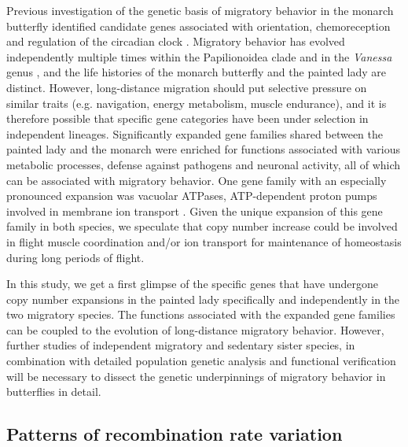\documentclass[twocolumn]{bmcart}%
\begin{document}
Previous investigation of the genetic basis of migratory behavior in the monarch butterfly identified candidate genes associated with orientation, chemoreception and regulation of the circadian clock \citep{zhanGeneticsMonarchButterfly2014, zhuDefiningBehavioralMolecular2009}. Migratory behavior has evolved independently multiple times within the Papilionoidea clade \citep{chowdhuryMigrationButterfliesGlobal2021} and in the \textit{Vanessa} genus \citep{wahlbergVagilityVanessaLepidoptera2011}, and the life histories of the monarch butterfly and the painted lady are distinct. However, long-distance migration should put selective pressure on similar traits (e.g. navigation, energy metabolism, muscle endurance), and it is therefore possible that specific gene categories have been under selection in independent lineages. Significantly expanded gene families shared between the painted lady and the monarch were enriched for functions associated with various metabolic processes, defense against pathogens and neuronal activity, all of which can be associated with migratory behavior. One gene family with an especially pronounced expansion was vacuolar ATPases, ATP-dependent proton pumps involved in membrane ion transport \citep{wieczorekVacuolartypeProtonPumps2009}. Given the unique expansion of this gene family in both species, we speculate that copy number increase could be involved in flight muscle coordination and/or ion transport for maintenance of homeostasis during long periods of flight.

In this study, we get a first glimpse of the specific genes that have undergone copy number expansions in the painted lady specifically and independently in the two migratory species. The functions associated with the expanded gene families can be coupled to the evolution of long-distance migratory behavior. However, further studies of independent migratory and sedentary sister species, in combination with detailed population genetic analysis and functional verification will be necessary to dissect the genetic underpinnings of migratory behavior in butterflies in detail.

\subsection*{Patterns of recombination rate variation}
\end{document}
